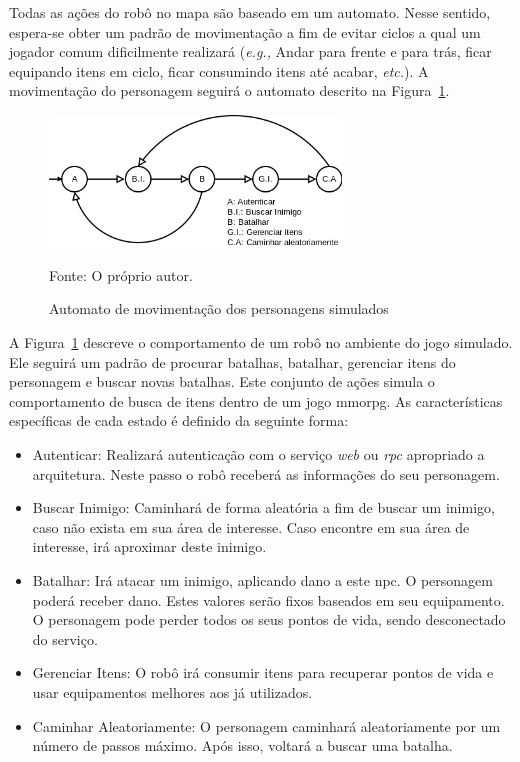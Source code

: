 Todas as ações do robô no mapa são baseado em um automato.
%
Nesse sentido, espera-se obter um padrão de movimentação a fim de evitar ciclos a qual um jogador comum dificilmente realizará (\textit{e.g.,} Andar para frente e para trás, ficar equipando itens em ciclo, ficar consumindo itens até acabar, \textit{etc.}).
%
A movimentação do personagem seguirá o automato descrito na Figura~\ref{fig:movimentacao}.


\begin{figure}[htb!]
  \caption{Automato de movimentação dos personagens simulados}
  \label{fig:movimentacao}
  \includegraphics[height=3.5cm]{img/cap3/movimentacao.png}
  \centering

  Fonte: O próprio autor.
\end{figure}

A Figura~\ref{fig:movimentacao} descreve o comportamento de um robô no ambiente do jogo simulado.
%
Ele seguirá um padrão de procurar batalhas, batalhar, gerenciar itens do personagem e buscar novas batalhas.
%
Este conjunto de ações simula o comportamento de busca de itens dentro de um jogo \ac{mmorpg}.
%
As características específicas de cada estado é definido da seguinte forma:

\begin{itemize}
  \item Autenticar: Realizará autenticação com o serviço \textit{web} ou \textit{rpc} apropriado a arquitetura. Neste passo o robô receberá as informações do seu personagem.
  \item Buscar Inimigo: Caminhará de forma aleatória a fim de buscar um inimigo, caso não exista em sua área de interesse. Caso encontre em sua área de interesse, irá aproximar deste inimigo.
  \item Batalhar: Irá atacar um inimigo, aplicando dano a este \ac{npc}. O personagem poderá receber dano. Estes valores serão fixos baseados em seu equipamento. O personagem pode perder todos os seus pontos de vida, sendo desconectado do serviço.
  \item Gerenciar Itens: O robô irá consumir itens para recuperar pontos de vida e usar equipamentos melhores aos já utilizados.
  \item Caminhar Aleatoriamente: O personagem caminhará aleatoriamente por um número de passos máximo. Após isso, voltará a buscar uma batalha.
\end{itemize}

